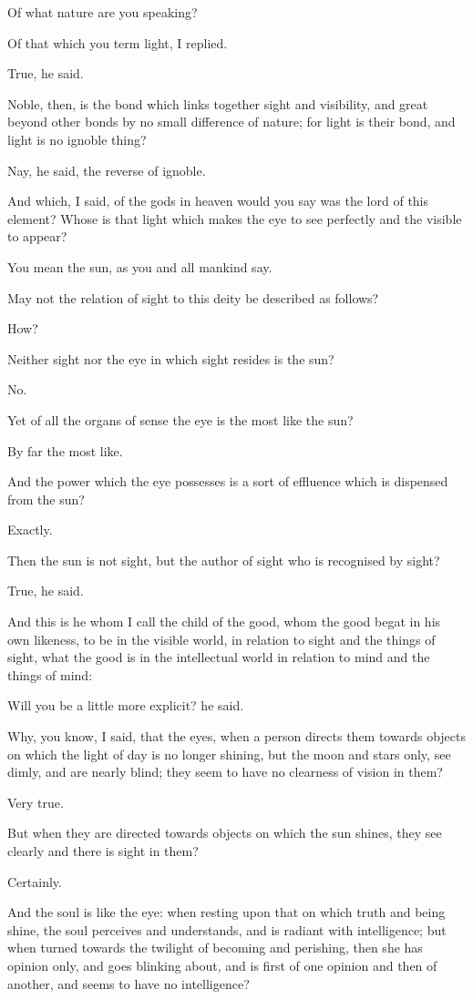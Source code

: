 Of what nature are you speaking?

Of that which you term light, I replied.

True, he said.

Noble, then, is the bond which links together sight and visibility, and
great beyond other bonds by no small difference of nature; for light is
their bond, and light is no ignoble thing?

Nay, he said, the reverse of ignoble.

And which, I said, of the gods in heaven would you say was the lord of
this element? Whose is that light which makes the eye to see perfectly
and the visible to appear?

You mean the sun, as you and all mankind say.

May not the relation of sight to this deity be described as follows?

How?

Neither sight nor the eye in which sight resides is the sun?

No.

Yet of all the organs of sense the eye is the most like the sun?

By far the most like.

And the power which the eye possesses is a sort of effluence which is
dispensed from the sun?

Exactly.

Then the sun is not sight, but the author of sight who is recognised by
sight?

True, he said.

And this is he whom I call the child of the good, whom the good begat in
his own likeness, to be in the visible world, in relation to sight
and the things of sight, what the good is in the intellectual world in
relation to mind and the things of mind:

Will you be a little more explicit? he said.

Why, you know, I said, that the eyes, when a person directs them towards
objects on which the light of day is no longer shining, but the moon
and stars only, see dimly, and are nearly blind; they seem to have no
clearness of vision in them?

Very true.

But when they are directed towards objects on which the sun shines, they
see clearly and there is sight in them?

Certainly.

And the soul is like the eye: when resting upon that on which truth and
being shine, the soul perceives and understands, and is radiant with
intelligence; but when turned towards the twilight of becoming and
perishing, then she has opinion only, and goes blinking about, and
is first of one opinion and then of another, and seems to have no
intelligence?

